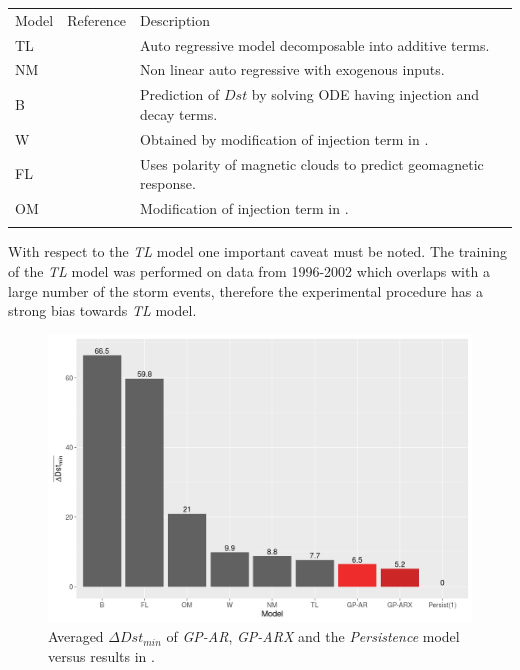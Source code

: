 \documentclass[referee,a4paper,12pt,traditabstract]{swsc}
\begin{document}
\begin{linenumbers}
\begin{table}
         \begin{tabular}{lll}
            \hline
            \noalign{\smallskip}
            Model  &  Reference  &  Description \\
            \noalign{\smallskip}
            \hline
            \noalign{\smallskip}
            TL & \citet{JGRA:JGRA16300} & Auto regressive model decomposable into additive terms.      \\
            NM & \citet{balikhin:narmax} & Non linear auto regressive with exogenous inputs. \\
            B & \citet{JGR:JGR10260} & Prediction of $Dst$ by solving ODE having injection and decay terms. \\
            W & \citet{Wang:Dst} & Obtained by modification of injection term in \citet{JGR:JGR10260}. \\
            FL & \citet{GRL:GRL11549} & Uses polarity of magnetic clouds to predict geomagnetic response.\\
            OM & \citet{JGRA:JGRA14856} & Modification of injection term in \citet{JGR:JGR10260}.\\
            \noalign{\smallskip}
            \hline
         \end{tabular}
\end{table}

With respect to the \emph{TL} model one important caveat must be noted. The training of the \emph{TL} model was performed on data from 1996-2002 which overlaps with a large number of the storm events, therefore the experimental procedure has a strong bias towards \emph{TL} model.

\begin{figure}
   \centering
   \includegraphics[width=\textwidth]{Compare_deltaDst.png}
      \caption{Averaged $\Delta Dst_{min}$ of \emph{GP-AR}, \emph{GP-ARX} and the \emph{Persistence} model versus results in \citet{Ji2012}.}
         \label{fig:deltaDst}
   \end{figure}


\end{linenumbers}
\end{document}
